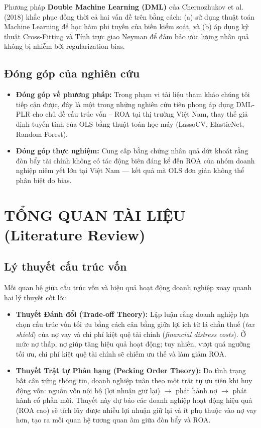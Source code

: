 \documentclass[12pt,a4paper]{article}
\begin{document}
Phương pháp \textbf{Double Machine Learning (DML)} của Chernozhukov et al. (2018) khắc phục đồng thời cả hai vấn đề trên bằng cách: (a) sử dụng thuật toán Machine Learning để học hàm phi tuyến của biến kiểm soát, và (b) áp dụng kỹ thuật Cross-Fitting và Tính trực giao Neyman để đảm bảo ước lượng nhân quả không bị nhiễm bởi regularization bias.

\subsection{Đóng góp của nghiên cứu}
\begin{itemize}
    \item \textbf{Đóng góp về phương pháp:} Trong phạm vi tài liệu tham khảo chúng tôi tiếp cận được, đây là một trong những nghiên cứu tiên phong áp dụng DML-PLR cho chủ đề cấu trúc vốn -- ROA tại thị trường Việt Nam, thay thế giả định tuyến tính của OLS bằng thuật toán học máy (LassoCV, ElasticNet, Random Forest).
    \item \textbf{Đóng góp thực nghiệm:} Cung cấp bằng chứng nhân quả dứt khoát rằng đòn bẩy tài chính không có tác động biên đáng kể đến ROA của nhóm doanh nghiệp niêm yết lớn tại Việt Nam --- kết quả mà OLS đơn giản không thể phân biệt do bias.
\end{itemize}

\section{TỔNG QUAN TÀI LIỆU (Literature Review)}

\subsection{Lý thuyết cấu trúc vốn}
Mối quan hệ giữa cấu trúc vốn và hiệu quả hoạt động doanh nghiệp xoay quanh hai lý thuyết cốt lõi:
\begin{itemize}
    \item \textbf{Thuyết Đánh đổi (Trade-off Theory):} Lập luận rằng doanh nghiệp lựa chọn cấu trúc vốn tối ưu bằng cách cân bằng giữa lợi ích từ lá chắn thuế (\textit{tax shield}) của nợ vay và chi phí kiệt quệ tài chính (\textit{financial distress costs}). Ở mức nợ thấp, nợ giúp tăng hiệu quả hoạt động; tuy nhiên, vượt quá ngưỡng tối ưu, chi phí kiệt quệ tài chính sẽ chiếm ưu thế và làm giảm ROA.
    \item \textbf{Thuyết Trật tự Phân hạng (Pecking Order Theory):} Do tình trạng bất cân xứng thông tin, doanh nghiệp tuân theo một trật tự ưu tiên khi huy động vốn: nguồn vốn nội bộ (lợi nhuận giữ lại) $\rightarrow$ phát hành nợ $\rightarrow$ phát hành cổ phần mới. Thuyết này dự báo các doanh nghiệp hoạt động hiệu quả (ROA cao) sẽ tích lũy được nhiều lợi nhuận giữ lại và ít phụ thuộc vào nợ vay hơn, tạo ra mối quan hệ tương quan âm giữa đòn bẩy và ROA.
\end{itemize}
\end{document}
